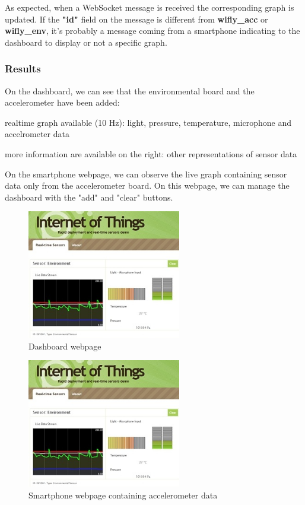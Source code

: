 \documentclass[pdftex,10pt,a4paper]{report}
\newenvironment{packed_item}{
\begin{itemize}
  \setlength{\itemsep}{1pt}
  \setlength{\parskip}{0pt}
  \setlength{\parsep}{0pt}
}{\end{itemize}}
\begin{document}
As expected, when a WebSocket message is received the corresponding graph is updated. If the \textbf{"id"} field on the message is different from \textbf{wifly\_acc} or \textbf{wifly\_env}, it's probably a message coming from a smartphone indicating to the dashboard to display or not a specific graph. 

\subsubsection{Results}

On the dashboard, we can see that the environmental board and the accelerometer have been added:
\begin{packed_item}
	\item realtime graph available (10 Hz): light, pressure, temperature, microphone and accelrometer data
	\item more information are available on the right: other representations of sensor data
\end{packed_item}

On the smartphone webpage, we can observe the live graph containing sensor data only from the accelerometer board. On this webpage, we can manage the dashboard with the "add" and "clear" buttons.
\newpage

\begin{figure}[h!]
		\centering
		\includegraphics[width=0.6\textwidth]{./dashboard.jpg}
		\caption{Dashboard webpage}
		\label{Dashboard webpage}
\end{figure}

\begin{figure}[h!]
		\centering
		\includegraphics[width=0.6\textwidth]{./dashboard.jpg}
		\caption{Smartphone webpage containing accelerometer data}
		\label{Smartphone webpage containing accelerometer data}
\end{figure}
\end{document}
